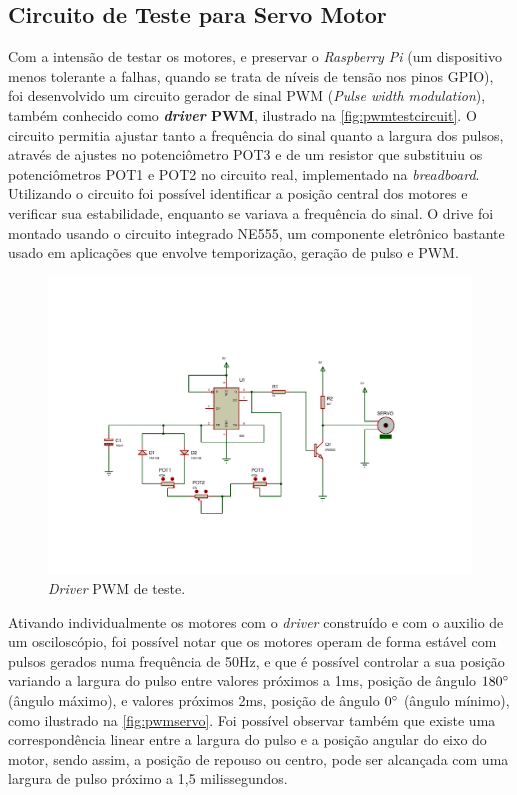 \subsection{Circuito de Teste para Servo Motor}
\label{subsec:servotester}

Com a intensão de testar os motores, e preservar o \textit{Raspberry Pi} (um dispositivo menos tolerante a falhas, quando se trata de níveis de tensão nos pinos GPIO), foi desenvolvido um circuito gerador de sinal PWM (\textit{Pulse width modulation}), também conhecido como \textbf{\textit{driver} PWM}, ilustrado na \autoref{fig:pwmtestcircuit}. O circuito permitia ajustar tanto a frequência do sinal quanto a largura dos pulsos, através de ajustes no potenciômetro POT3 e de um resistor que substituiu os potenciômetros POT1 e POT2 no circuito real, implementado na \textit{breadboard}. Utilizando o circuito foi possível identificar a posição central dos motores e verificar sua estabilidade, enquanto se variava a frequência do sinal. O drive foi montado usando o circuito integrado NE555, um componente eletrônico bastante usado em aplicações que envolve temporização, geração de pulso e PWM. \par

\begin{figure}[H]
	\centering
	\includegraphics[trim={2.5cm 3cm 4cm 5cm},clip,width=1\textwidth]{figuras/pwm2.pdf}
	\caption{\textit{Driver} PWM de teste.}
	\label{fig:pwmtestcircuit}
\end{figure}

Ativando individualmente os motores com o \textit{driver} construído e com o auxilio de um osciloscópio, foi possível notar que os motores operam de forma estável com pulsos gerados numa frequência de 50Hz, e que é possível controlar a sua posição variando a largura do pulso entre valores próximos a 1ms, posição de ângulo $180\degree$ (ângulo máximo), e valores próximos 2ms, posição de ângulo $0\degree$ (ângulo mínimo), como ilustrado na \autoref{fig:pwmservo}. Foi possível observar também que existe uma correspondência linear entre a largura do pulso e a posição angular do eixo do motor, sendo assim, a posição de repouso ou centro, pode ser alcançada com uma largura de pulso próximo a 1,5 milissegundos. 

